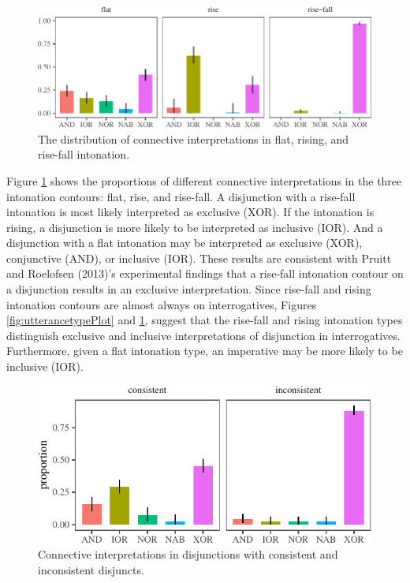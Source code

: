 \documentclass[floatsintext,man]{apa6}
\theoremstyle{definition}
\theoremstyle{definition}
\theoremstyle{definition}
\theoremstyle{remark}
\begin{document}
\begin{figure}[tb]

{\centering \includegraphics{figs/intonationPlot-1} 

}

\caption{The distribution of connective interpretations in flat, rising, and rise-fall intonation.}\label{fig:intonationPlot}
\end{figure}

Figure \ref{fig:intonationPlot} shows the proportions of different
connective interpretations in the three intonation contours: flat, rise,
and rise-fall. A disjunction with a rise-fall intonation is most likely
interpreted as exclusive (XOR). If the intonation is rising, a
disjunction is more likely to be interpreted as inclusive (IOR). And a
disjunction with a flat intonation may be interpreted as exclusive
(XOR), conjunctive (AND), or inclusive (IOR). These results are
consistent with Pruitt and Roelofsen (2013)'s experimental findings that
a rise-fall intonation contour on a disjunction results in an exclusive
interpretation. Since rise-fall and rising intonation contours are
almost always on interrogatives, Figures \ref{fig:utterancetypePlot} and
\ref{fig:intonationPlot}, suggest that the rise-fall and rising
intonation types distinguish exclusive and inclusive interpretations of
disjunction in interrogatives. Furthermore, given a flat intonation
type, an imperative may be more likely to be inclusive (IOR).

\begin{figure}[tb]

{\centering \includegraphics{figs/consistencyPlot-1} 

}

\caption{Connective interpretations in disjunctions with consistent and inconsistent disjuncts.}\label{fig:consistencyPlot}
\end{figure}
\end{document}
